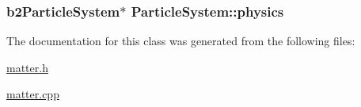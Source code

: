 \subsubsection[{physics}]{\setlength{\rightskip}{0pt plus 5cm}b2\+Particle\+System$\ast$ Particle\+System\+::physics\hspace{0.3cm}{\ttfamily [protected]}}\label{classParticleSystem_a899787ecc1f14a30cd903a884ec7575e}


The documentation for this class was generated from the following files\+:\begin{DoxyCompactItemize}
\item 
\hyperlink{matter_8h}{matter.\+h}\item 
\hyperlink{matter_8cpp}{matter.\+cpp}\end{DoxyCompactItemize}
